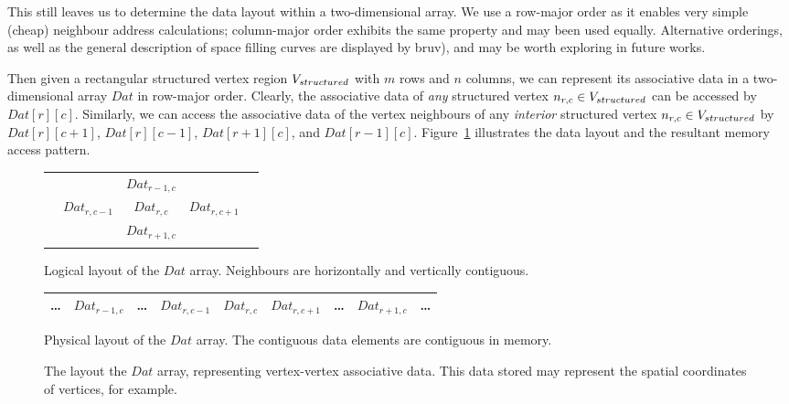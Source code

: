 This still leaves us to determine the data layout within a two-dimensional array. We use a row-major order as it enables very simple (cheap) neighbour address calculations; column-major order exhibits the same property and may been used equally. Alternative orderings, as well as the general description of space filling curves are displayed by bruv), and may be worth exploring in future works.

Then given a rectangular structured vertex region $V_{structured}$ with $m$ rows and $n$ columns, we can represent its associative data in a two-dimensional array $Dat$ in row-major order. Clearly, the associative data of \emph{any} structured vertex $n_{r,c} \in V_{structured}$ can be accessed by $Dat[r][c]$. Similarly, we can access the associative data of the vertex neighbours of any \emph{interior} structured vertex $n_{r,c} \in V_{structured}$ by $Dat[r][c+1]$, $Dat[r][c-1]$, $Dat[r+1][c]$, and $Dat[r-1][c]$. Figure~\ref{fig:array-layout} illustrates the data layout and the resultant memory access pattern.


\begin{figure}
\sidebysidevertical
{
	\begin{tabular}{c|c|c|c|c}
	 &               &               &               & \\ \hline \rowcolor{yellow!40}
	 &               & $Dat_{r-1,c}$ &               & \\ \hline \rowcolor{green!40}
	 & $Dat_{r,c-1}$ & $Dat_{r,c}$   & $Dat_{r,c+1}$ & \\ \hline \rowcolor{red!40}
	 &               & $Dat_{r+1,c}$ &               & \\ \hline
	 &               &               &               &
	\end{tabular}
	\caption{Logical layout of the $Dat$ array. Neighbours are horizontally and vertically contiguous.}
}
{
	\begin{tabular}{c|c|c|c|c|c|c|c|c}
	\hline
	\ldots & \cellcolor{yellow!40} $Dat_{r-1,c}$ &
	\ldots & \cellcolor{green!40} $Dat_{r,c-1}$ & \cellcolor{green!40} $Dat_{r,c}$ & \cellcolor{green!40} $Dat_{r,c+1}$ &
	\ldots & \cellcolor{red!40} $Dat_{r+1,c}$ &
	\ldots \\
	\hline
	\end{tabular}
	\caption{Physical layout of the $Dat$ array. The contiguous data elements are contiguous in memory.}
}
\caption{The layout the $Dat$ array, representing vertex-vertex associative data. This data stored may represent the spatial coordinates of vertices, for example.}
\label{fig:array-layout}
\end{figure}



